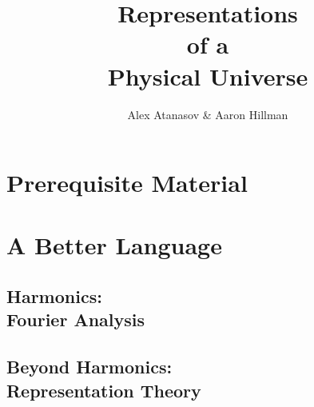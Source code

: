 \documentclass[12pt, twoside, openany]{book}
\title{\textbf{\Huge Representations\\ \large of a\\ \LARGE Physical \LARGE Universe}}
\author{Alex Atanasov \& Aaron Hillman}
\newcommand{\1}{\mathbbm{1}}
\begin{document}
\maketitle
\tableofcontents




	









\part{Prerequisite Material}









\part{A Better Language}



\chapter[Harmonics: Fourier Analysis]{Harmonics:\\ Fourier Analysis}


\chapter[Beyond Harmonics: Representation Theory]{Beyond Harmonics:\\ Representation Theory}
\end{document}
